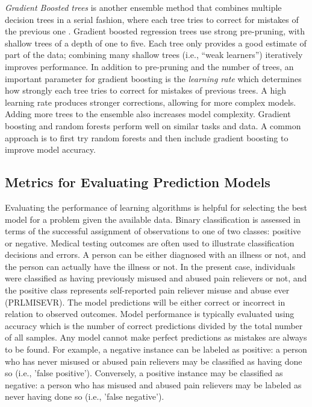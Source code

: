 \documentclass[sigconf]{acmart}
\begin{document}

\emph{Gradient Boosted trees} is another ensemble method that combines 
multiple decision trees in a serial fashion, where each tree tries to correct 
for mistakes of the previous one \cite{muller17}. Gradient boosted regression 
trees use strong pre-pruning, with shallow trees of a depth of one to five. 
Each tree only provides a good estimate of part of the data; combining many 
shallow trees (i.e., ``weak learners'') iteratively improves performance. 
In addition to pre-pruning and the number of trees, an important parameter 
for gradient boosting is the \emph{learning rate} which determines how 
strongly each tree tries to correct for mistakes of previous trees. A high 
learning rate produces stronger corrections, allowing for more complex models. 
Adding more trees to the ensemble also increases model complexity. Gradient 
boosting and random forests perform well on similar tasks and data. A common 
approach is to first try random forests and then include gradient boosting 
to improve model accuracy. 


\subsection{Metrics for Evaluating Prediction Models}

Evaluating the performance of learning algorithms is helpful for selecting 
the best model for a problem given the available data. Binary classification 
is assessed in terms of the successful assignment of observations to one of 
two classes: positive or negative. Medical testing outcomes are often used to 
illustrate classification decisions and errors. A person can be either 
diagnosed with an illness or not, and the person can actually have the 
illness or not. In the present case, individuals were classified as having 
previously misused and abused pain relievers or not, and the positive class
represents self-reported pain reliever misuse and abuse ever (PRLMISEVR).
The model predictions will be either correct or incorrect in relation to
observed outcomes. Model performance is typically evaluated using accuracy 
which is the number of correct predictions divided by the total number of 
all samples. Any model cannot make perfect predictions as mistakes are 
always to be found. For example, a negative instance can be labeled 
as positive: a person who has never misused or abused pain relievers may be 
classified as having done so (i.e., 'false positive'). Conversely, a positive 
instance may be classified as negative: a person who has misused and abused 
pain relievers may be labeled as never having done so (i.e., 'false negative').
\end{document}
